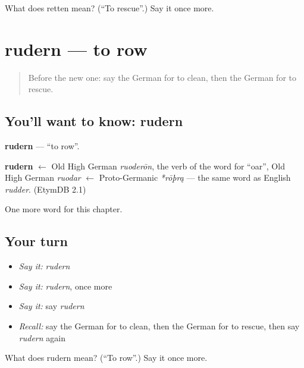 \begin{tcolorbox}[breakable,colback=teal!4,colframe=teal!35!black,title={Before you move on}]
What does retten mean? (\textquotedblleft{}To rescue\textquotedblright{}.) Say it once more.
\end{tcolorbox}
\section[rudern]{rudern — to row}

\label{lesson:GE-C185-rudern}



\begin{quote}
Before the new one: say the German for to clean, then the German for to rescue.
\end{quote}

\subsection*{You'll want to know: rudern}
\textbf{rudern} — \textquotedblleft{}to row\textquotedblright{}.

\begin{cousinweb}
\textbf{rudern} $\leftarrow$ Old High German \emph{ruoderōn}, the verb of the word for \textquotedblleft{}oar\textquotedblright{}, Old High German \emph{ruodar} $\leftarrow$ Proto-Germanic \emph{*rōþrą} — the same word as English \emph{rudder}. (EtymDB 2.1)
\end{cousinweb}

\begin{grammarlens}[title={What you've built}]
One more word for this chapter.
\end{grammarlens}

\subsection*{Your turn}
\begin{itemize}
\raggedright
  \item \emph{Say it:} \emph{rudern}
  \item \emph{Say it:} \emph{rudern}, once more
  \item \emph{Say it:} say \emph{rudern}
  \item \emph{Recall:} say the German for to clean, then the German for to rescue, then say \emph{rudern} again
\end{itemize}

\begin{tcolorbox}[breakable,colback=teal!4,colframe=teal!35!black,title={Before you move on}]
What does rudern mean? (\textquotedblleft{}To row\textquotedblright{}.) Say it once more.
\end{tcolorbox}
